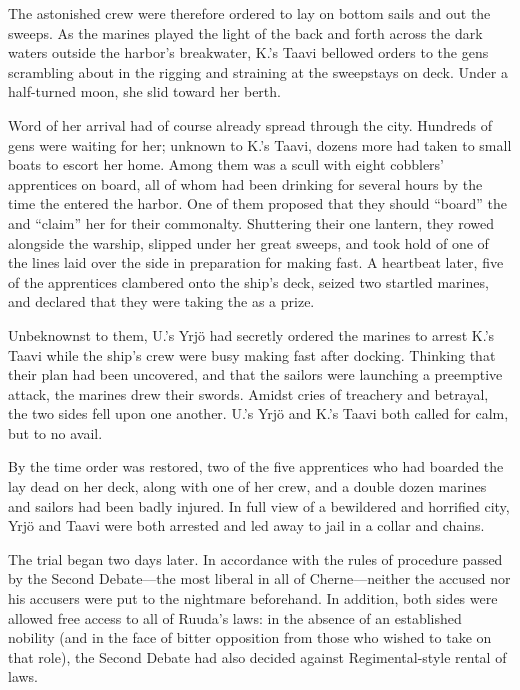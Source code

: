 \documentclass[12pt]{report}
\begin{document}
The astonished crew were therefore ordered to lay on bottom sails and
out the sweeps.  As the marines played the light of the  back and forth across the dark waters outside the harbor's
breakwater, K.'s Taavi bellowed orders to the gens scrambling about in
the rigging and straining at the sweepstays on deck.  Under a
half-turned moon, she slid toward her berth.

Word of her arrival had of course already spread through the city.
Hundreds of gens were waiting for her; unknown to K.'s Taavi, dozens
more had taken to small boats to escort her home.  Among them was a
scull with eight cobblers' apprentices on board, all of whom had been
drinking for several hours by the time the 
entered the harbor.  One of them proposed that they should ``board'' the
 and ``claim'' her for their commonalty.
Shuttering their one lantern, they rowed alongside the warship,
slipped under her great sweeps, and took hold of one of the lines laid
over the side in preparation for making fast.  A heartbeat later, five
of the apprentices clambered onto the ship's deck, seized two startled
marines, and declared that they were taking the 
as a prize.

Unbeknownst to them, U.'s Yrj\"{o} had secretly ordered the marines to
arrest K.'s Taavi while the ship's crew were busy making fast after
docking.  Thinking that their plan had been uncovered, and that the
sailors were launching a preemptive attack, the marines drew their
swords.  Amidst cries of treachery and betrayal, the two sides fell
upon one another.  U.'s Yrj\"{o} and K.'s Taavi both called for calm,
but to no avail.

By the time order was restored, two of the five apprentices who had
boarded the  lay dead on her deck, along with
one of her crew, and a double dozen marines and sailors had been badly
injured.  In full view of a bewildered and horrified city, Yrj\"{o}
and Taavi were both arrested and led away to jail in a collar and
chains.

The trial began two days later.  In accordance with the rules of
procedure passed by the Second Debate---the most liberal in all of
Cherne---neither the accused nor his accusers were put to the
nightmare beforehand.  In addition, both sides were allowed free
access to all of Ruuda's laws: in the absence of an established
nobility (and in the face of bitter opposition from those who wished
to take on that role), the Second Debate had also decided against
Regimental-style rental of laws.
\end{document}
